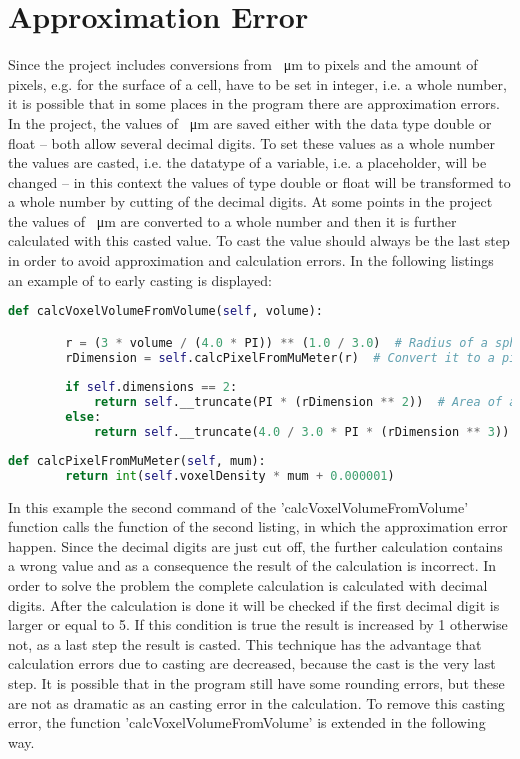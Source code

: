\section{Approximation Error}
Since the project includes conversions from \SI{}{\micro\metre} to pixels and the amount of pixels, e.g. for the surface of a cell, have to be set in integer, i.e. a whole number, it is possible that in some places in the program there are approximation errors. In the project, the values of \SI{}{\micro\metre} are saved either with the data type double or float -- both allow several decimal digits. To set these values as a whole number the values are casted, i.e. the datatype of a variable, i.e. a placeholder, will be changed -- in this context the values of type double or float will be transformed to a whole number by cutting of the decimal digits. At some points in the project the values of \SI{}{\micro\metre} are converted to a whole number and then it is further calculated with this casted value. To cast the value should always be the last step in order to avoid approximation and calculation errors. In the following listings an example of to early casting is displayed:

\begin{lstlisting}[language=Python, caption=example of an calculation error because of an too early executed cast]
    def calcVoxelVolumeFromVolume(self, volume):

        r = (3 * volume / (4.0 * PI)) ** (1.0 / 3.0)  # Radius of a sphere with known volume.
        rDimension = self.calcPixelFromMuMeter(r)  # Convert it to a pixel unit.
        
        if self.dimensions == 2:
            return self.__truncate(PI * (rDimension ** 2))  # Area of a circle.
        else:
			return self.__truncate(4.0 / 3.0 * PI * (rDimension ** 3)) # Volume of a sphere.
\end{lstlisting}
\begin{lstlisting}[language=Python, caption=function to convert values of \SI{}{\micro\metre} into pixel]
    def calcPixelFromMuMeter(self, mum):
		return int(self.voxelDensity * mum + 0.000001)
\end{lstlisting}

In this example the second command of the 'calcVoxelVolumeFromVolume' function calls the function of the second listing, in which the approximation error happen. Since the decimal digits are just cut off, the further calculation contains a wrong value and as a consequence the result of the calculation is incorrect. \newline
In order to solve the problem the complete calculation is calculated with decimal digits. After the calculation is done it will be checked if the first decimal digit is larger or equal to 5. If this condition is true the result is increased by 1 otherwise not, as a last step the result is casted. This technique has the advantage that calculation errors due to casting are decreased, because the cast is the very last step. It is possible that in the program still have some rounding errors, but these are not as dramatic as an casting error in the calculation. To remove this casting error, the function 'calcVoxelVolumeFromVolume' is extended in the following way.

